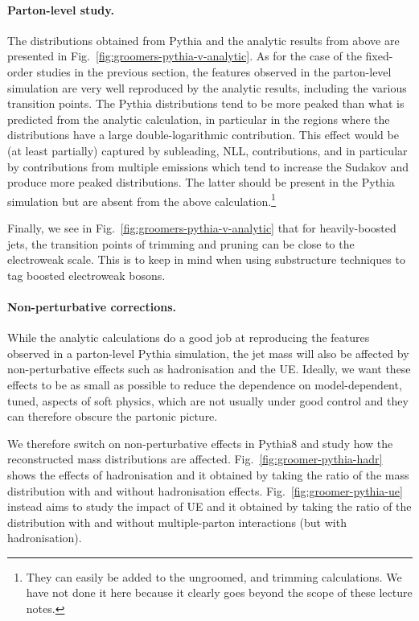 \paragraph{Parton-level study.}
%
The distributions obtained from Pythia and the analytic results from
above are presented in Fig.~\ref{fig:groomers-pythia-v-analytic}. As
for the case of the fixed-order studies in the previous section, the
features observed in the parton-level simulation are very well
reproduced by the analytic results, including the various transition
points.
%
The Pythia distributions tend to be more peaked than what is predicted
from the analytic calculation, in particular in the regions where the
distributions have a large double-logarithmic contribution. This
effect would be (at least partially) captured by subleading, NLL,
contributions, and in particular by contributions from multiple
emissions which tend to increase the Sudakov and produce more peaked
distributions. The latter should be present in the Pythia simulation
but are absent from the above calculation.\footnote{They can easily be
  added to the ungroomed, \SD and trimming calculations. We have
  not done it here because it clearly goes beyond the scope of these
  lecture notes.}


Finally, we see in Fig.~\ref{fig:groomers-pythia-v-analytic} that for
heavily-boosted jets, the transition points of trimming and pruning
can be close to the electroweak scale. This is to keep in mind when
using substructure techniques to tag boosted electroweak bosons. 

\paragraph{Non-perturbative corrections.}
%
While the analytic calculations do a good job at reproducing the
features observed in a parton-level Pythia simulation, the jet mass
will also be affected by non-perturbative effects such as
hadronisation and the UE.
%
Ideally, we want these effects to be as small as possible to reduce
the dependence on model-dependent, tuned, aspects of soft physics,
which are not usually under good control and they can therefore obscure the partonic picture.

We therefore switch on non-perturbative effects in Pythia8 and
study how the reconstructed mass distributions are affected.
%
Fig.~\ref{fig:groomer-pythia-hadr} shows the effects of
hadronisation and it obtained by taking
the ratio of the mass distribution with and without hadronisation
effects. 
%
Fig.~\ref{fig:groomer-pythia-ue} instead aims to study the impact of UE and it obtained by taking the ratio of the
distribution with and without multiple-parton interactions (but with
hadronisation).


